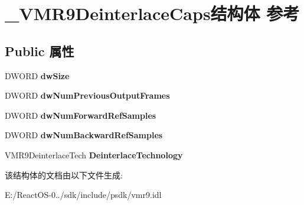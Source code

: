 \hypertarget{struct___v_m_r9_deinterlace_caps}{}\section{\+\_\+\+V\+M\+R9\+Deinterlace\+Caps结构体 参考}
\label{struct___v_m_r9_deinterlace_caps}
\subsection*{Public 属性}
\begin{DoxyCompactItemize}
\item 
\mbox{\label{struct___v_m_r9_deinterlace_caps_a94c503fbd2f12430860ede962accff91}} 
D\+W\+O\+RD {\bfseries dw\+Size}
\item 
\mbox{\label{struct___v_m_r9_deinterlace_caps_a6d930225a520721f0b9c63ed3ef0af63}} 
D\+W\+O\+RD {\bfseries dw\+Num\+Previous\+Output\+Frames}
\item 
\mbox{\label{struct___v_m_r9_deinterlace_caps_a37798e7fbdd1bdf759b5eb4962e996b2}} 
D\+W\+O\+RD {\bfseries dw\+Num\+Forward\+Ref\+Samples}
\item 
\mbox{\label{struct___v_m_r9_deinterlace_caps_ac1f7cbad7ee4bc0bf189f21ebb908507}} 
D\+W\+O\+RD {\bfseries dw\+Num\+Backward\+Ref\+Samples}
\item 
\mbox{\label{struct___v_m_r9_deinterlace_caps_a67e9db6c16366ebff57b18c57525ba43}} 
V\+M\+R9\+Deinterlace\+Tech {\bfseries Deinterlace\+Technology}
\end{DoxyCompactItemize}


该结构体的文档由以下文件生成\+:\begin{DoxyCompactItemize}
\item 
E\+:/\+React\+O\+S-\/0../sdk/include/psdk/vmr9.\+idl\end{DoxyCompactItemize}
